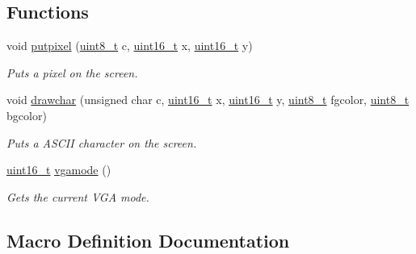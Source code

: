 \subsection*{Functions}
\begin{DoxyCompactItemize}
\item 
void \hyperlink{a00011_ab17a69b465efb1ebe54a6a2e5d7b7ce8_ab17a69b465efb1ebe54a6a2e5d7b7ce8}{putpixel} (\hyperlink{a00068_aba7bc1797add20fe3efdf37ced1182c5_aba7bc1797add20fe3efdf37ced1182c5}{uint8\+\_\+t} c, \hyperlink{a00068_a273cf69d639a59973b6019625df33e30_a273cf69d639a59973b6019625df33e30}{uint16\+\_\+t} x, \hyperlink{a00068_a273cf69d639a59973b6019625df33e30_a273cf69d639a59973b6019625df33e30}{uint16\+\_\+t} y)
\begin{DoxyCompactList}\small\item\em Puts a pixel on the screen. \end{DoxyCompactList}\item 
void \hyperlink{a00011_a2c8df7a20b47341b70d97a7ff21d86ea_a2c8df7a20b47341b70d97a7ff21d86ea}{drawchar} (unsigned char c, \hyperlink{a00068_a273cf69d639a59973b6019625df33e30_a273cf69d639a59973b6019625df33e30}{uint16\+\_\+t} x, \hyperlink{a00068_a273cf69d639a59973b6019625df33e30_a273cf69d639a59973b6019625df33e30}{uint16\+\_\+t} y, \hyperlink{a00068_aba7bc1797add20fe3efdf37ced1182c5_aba7bc1797add20fe3efdf37ced1182c5}{uint8\+\_\+t} fgcolor, \hyperlink{a00068_aba7bc1797add20fe3efdf37ced1182c5_aba7bc1797add20fe3efdf37ced1182c5}{uint8\+\_\+t} bgcolor)
\begin{DoxyCompactList}\small\item\em Puts a A\+S\+C\+II character on the screen. \end{DoxyCompactList}\item 
\hyperlink{a00068_a273cf69d639a59973b6019625df33e30_a273cf69d639a59973b6019625df33e30}{uint16\+\_\+t} \hyperlink{a00011_af6d170c9401ea8f94d4c5cf09347cca7_af6d170c9401ea8f94d4c5cf09347cca7}{vgamode} ()
\begin{DoxyCompactList}\small\item\em Gets the current V\+GA mode. \end{DoxyCompactList}\end{DoxyCompactItemize}


\subsection{Macro Definition Documentation}
\mbox{\label{a00011_a2cd109632a6dcccaa80b43561b1ab700_a2cd109632a6dcccaa80b43561b1ab700}} 
